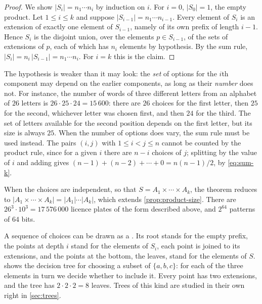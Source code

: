 \begin{proof}
We show $|S_i|=n_1\cdots n_i$ by induction on $i$. For $i=0$, $|S_0|=1$, the empty product. Let $1\le i\le k$ and suppose $|S_{i-1}|=n_1\cdots n_{i-1}$. Every element of $S_i$ is an extension of exactly one element of $S_{i-1}$, namely of its own prefix of length $i-1$. Hence $S_i$ is the disjoint union, over the elements $p\in S_{i-1}$, of the sets of extensions of $p$, each of which has $n_i$ elements by hypothesis. By the sum rule, $|S_i|=n_i\,|S_{i-1}|=n_1\cdots n_i$. For $i=k$ this is the claim.
\end{proof}

The hypothesis is weaker than it may look: the \emph{set} of options for the $i$th component may depend on the earlier components, as long as their \emph{number} does not. For instance, the number of words of three different letters from an alphabet of $26$ letters is $26\cdot25\cdot24=15\,600$: there are $26$ choices for the first letter, then $25$ for the second, whichever letter was chosen first, and then $24$ for the third. The set of letters available for the second position depends on the first letter, but its size is always $25$. When the number of options does vary, the sum rule must be used instead. The pairs $(i,j)$ with $1\le i<j\le n$ cannot be counted by the product rule, since for a given $i$ there are $n-i$ choices of $j$; splitting by the value of $i$ and adding gives $(n-1)+(n-2)+\cdots+0=n(n-1)/2$, by \eqref{eq:sum-k}.

When the choices are independent, so that $S=A_1\times\cdots\times A_k$, the theorem reduces to $|A_1\times\cdots\times A_k|=|A_1|\cdots|A_k|$, which extends \cref{prop:product-size}. There are $26^3\cdot10^3=17\,576\,000$ licence plates of the form described above, and $2^{64}$ patterns of $64$ bits.

A sequence of choices can be drawn as a . Its root stands for the empty prefix, the points at depth $i$ stand for the elements of $S_i$, each point is joined to its extensions, and the points at the bottom, the leaves, stand for the elements of $S$.  shows the decision tree for choosing a subset of $\{a,b,c\}$: for each of the three elements in turn we decide whether to include it. Every point has two extensions, and the tree has $2\cdot2\cdot2=8$ leaves. Trees of this kind are studied in their own right in \cref{sec:trees}.

